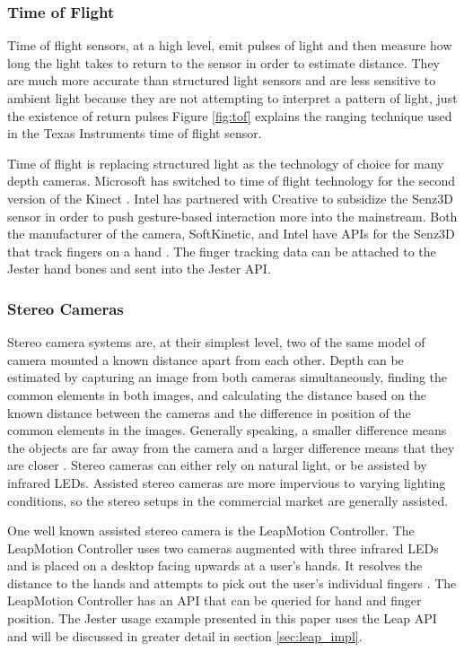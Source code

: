 \subsubsection{Time of Flight}

Time of flight sensors, at a high level, emit pulses of light and then measure how long the light takes to return to the sensor in order to estimate distance. They are much more accurate than structured light sensors and are less sensitive to ambient light because they are not attempting to interpret a pattern of light, just the existence of return pulses \cite{litime} Figure \ref{fig:tof} explains the ranging technique used in the Texas Instruments time of flight sensor. 

Time of flight is replacing structured light as the technology of choice for many depth cameras. Microsoft has switched to time of flight technology for the second version of the Kinect \cite{kinect2}. Intel has partnered with Creative to subsidize the Senz3D sensor in order to push gesture-based interaction more into the mainstream. Both the manufacturer of the camera, SoftKinetic, and Intel have APIs for the Senz3D that track fingers on a hand \cite{senz3d}. The finger tracking data can be attached to the Jester hand bones and sent into the Jester API.

\subsubsection{Stereo Cameras}

Stereo camera systems are, at their simplest level, two of the same model of camera mounted a known distance apart from each other. Depth can be estimated by capturing an image from both cameras simultaneously, finding the common elements in both images, and calculating the distance based on the known distance between the cameras and the difference in position of the common elements in the images. Generally speaking, a smaller difference means the objects are far away from the camera and a larger difference means that they are closer \cite{lucas1981iterative}. Stereo cameras can either rely on natural light, or be assisted by infrared LEDs. Assisted stereo cameras are more impervious to varying lighting conditions, so the stereo setups in the commercial market are generally assisted.

One well known assisted stereo camera is the LeapMotion Controller. The LeapMotion Controller uses two cameras augmented with three infrared LEDs and is placed on a desktop facing upwards at a user’s hands. It resolves the distance to the hands and attempts to pick out the user’s individual fingers \cite{weichert2013analysis}. The LeapMotion Controller has an API that can be queried for hand and finger position. The Jester usage example presented in this paper uses the Leap API and will be discussed in greater detail in section \ref{sec:leap_impl}.

